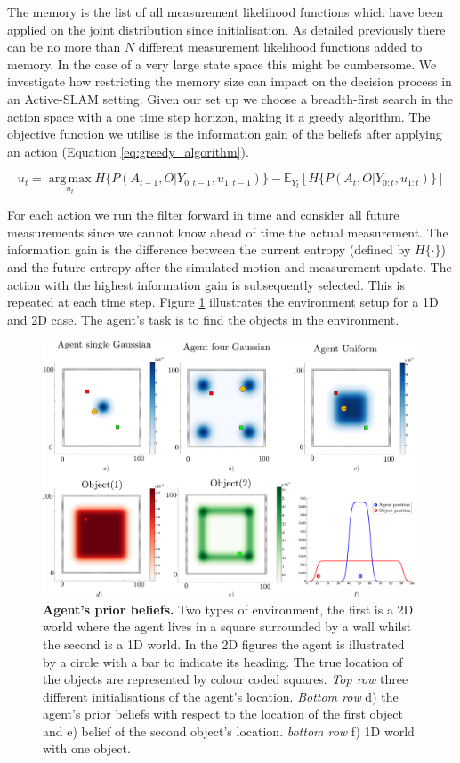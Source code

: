The memory is the list of all measurement likelihood functions which have been applied on the joint 
distribution since initialisation. As detailed previously there can be no more than $N$ different measurement likelihood functions added to 
memory. In the case of a very large state space this might be cumbersome. We investigate how restricting the memory size 
can impact on the decision process in an Active-SLAM setting. Given our set up we choose a breadth-first search in the action 
space with a one time step horizon, making it a greedy algorithm. The objective function we utilise is the information
gain of the beliefs after applying an action (Equation \ref{eq:greedy_algorithm}).

\begin{equation}\label{eq:greedy_algorithm}
 u_{t} = \operatorname*{arg\,max}_{u_t} H\{P(A_{t-1},O|Y_{0:t-1},u_{1:t-1})\} - \mathbb{E}_{Y_t}\left[H\{P(A_{t},O|Y_{0:t},u_{1:t})\}\right]
\end{equation}

For each action we run the filter forward in time and consider all future measurements since we cannot know ahead of time the actual 
measurement. The information gain is the difference between the current entropy (defined 
by $H\{\cdot\}$) and the future entropy after the simulated motion and measurement update. The action with the highest information gain 
is subsequently selected. This is repeated at each time step. Figure \ref{fig:exploration_init} illustrates the environment setup for 
a 1D and 2D case. The agent's task is to find the objects in the environment.


\begin{figure}
  \includegraphics[width=\textwidth]{./ch5-MLMF/Figures/Figure14.pdf}
  \caption{\textbf{Agent's prior beliefs.} Two types of environment, the first is 
  a 2D world where the agent lives in a square surrounded by a wall whilst the second is a 1D
  world. In the 2D figures the agent is illustrated by a circle with a bar to indicate its heading. The true location 
  of the objects are represented by colour coded squares. \textit{Top row} three different initialisations of the agent's location. 
  \textit{Bottom row} d) the agent's prior beliefs with respect to the location of the first object and e) belief of the second object's location.
  \textit{bottom row} f) 1D world with one object.}
  \label{fig:exploration_init}
\end{figure}

